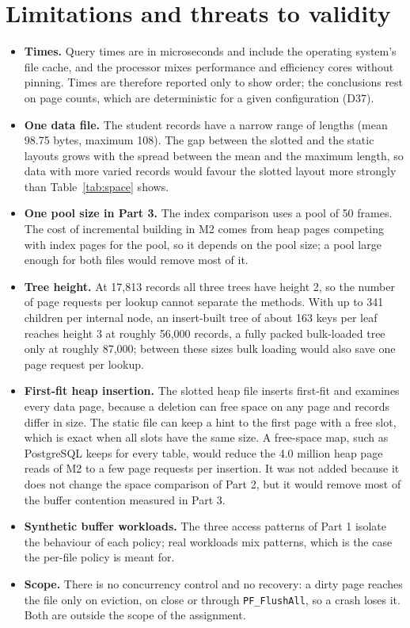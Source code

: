 \documentclass[11pt,a4paper]{article}
\begin{document}
\section{Limitations and threats to validity}
\label{sec:limits}

\begin{itemize}
\item \textbf{Times.} Query times are in microseconds and include the operating system's file cache, and the processor mixes performance and efficiency cores without pinning. Times are therefore reported only to show order; the conclusions rest on page counts, which are deterministic for a given configuration (D37).
\item \textbf{One data file.} The student records have a narrow range of lengths (mean 98.75 bytes, maximum 108). The gap between the slotted and the static layouts grows with the spread between the mean and the maximum length, so data with more varied records would favour the slotted layout more strongly than Table~\ref{tab:space} shows.
\item \textbf{One pool size in Part 3.} The index comparison uses a pool of 50 frames. The cost of incremental building in M2 comes from heap pages competing with index pages for the pool, so it depends on the pool size; a pool large enough for both files would remove most of it.
\item \textbf{Tree height.} At 17{,}813 records all three trees have height 2, so the number of page requests per lookup cannot separate the methods. With up to 341 children per internal node, an insert-built tree of about 163 keys per leaf reaches height 3 at roughly 56{,}000 records, a fully packed bulk-loaded tree only at roughly 87{,}000; between these sizes bulk loading would also save one page request per lookup.
\item \textbf{First-fit heap insertion.} The slotted heap file inserts first-fit and examines every data page, because a deletion can free space on any page and records differ in size. The static file can keep a hint to the first page with a free slot, which is exact when all slots have the same size. A free-space map, such as PostgreSQL keeps for every table, would reduce the 4.0 million heap page reads of M2 to a few page requests per insertion. It was not added because it does not change the space comparison of Part 2, but it would remove most of the buffer contention measured in Part 3.
\item \textbf{Synthetic buffer workloads.} The three access patterns of Part 1 isolate the behaviour of each policy; real workloads mix patterns, which is the case the per-file policy is meant for.
\item \textbf{Scope.} There is no concurrency control and no recovery: a dirty page reaches the file only on eviction, on close or through \texttt{PF\_FlushAll}, so a crash loses it. Both are outside the scope of the assignment.
\end{itemize}
\end{document}

